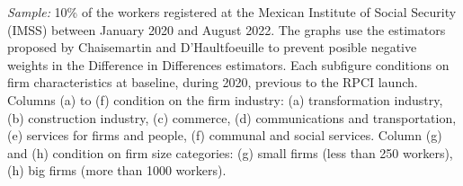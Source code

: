 \documentclass[oneside,11pt]{article}
\begin{document}
\scriptsize{
\noindent \textit{Sample:} 10\% of the workers registered at the Mexican Institute of Social Security (IMSS) between January 2020 and August 2022. The graphs use the estimators proposed by Chaisemartin and D'Haultfoeuille to prevent posible negative weights in the Difference in Differences estimators. Each subfigure conditions on firm characteristics at baseline, during 2020, previous to the RPCI launch. Columns (a) to (f) condition on the firm industry: (a) transformation industry, (b) construction industry, (c) commerce, (d) communications and transportation, (e) services for firms and people, (f) communal and social services. Column (g) and (h) condition on firm size categories: (g) small firms (less than 250 workers), (h) big firms (more than 1000 workers).
}

\clearpage
\end{document}
